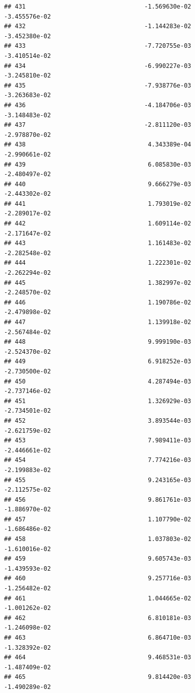 \documentclass[
]{article}
\begin{document}
\begin{verbatim}
## 431                                 -1.569630e-02          -3.455576e-02
## 432                                 -1.144283e-02          -3.452380e-02
## 433                                 -7.720755e-03          -3.410514e-02
## 434                                 -6.990227e-03          -3.245810e-02
## 435                                 -7.938776e-03          -3.263683e-02
## 436                                 -4.184706e-03          -3.148483e-02
## 437                                 -2.811120e-03          -2.978870e-02
## 438                                  4.343389e-04          -2.990661e-02
## 439                                  6.085830e-03          -2.480497e-02
## 440                                  9.666279e-03          -2.443302e-02
## 441                                  1.793019e-02          -2.289017e-02
## 442                                  1.609114e-02          -2.171647e-02
## 443                                  1.161483e-02          -2.282548e-02
## 444                                  1.222301e-02          -2.262294e-02
## 445                                  1.382997e-02          -2.248570e-02
## 446                                  1.190786e-02          -2.479898e-02
## 447                                  1.139918e-02          -2.567484e-02
## 448                                  9.999190e-03          -2.524370e-02
## 449                                  6.918252e-03          -2.730500e-02
## 450                                  4.287494e-03          -2.737146e-02
## 451                                  1.326929e-03          -2.734501e-02
## 452                                  3.893544e-03          -2.621759e-02
## 453                                  7.989411e-03          -2.446661e-02
## 454                                  7.774216e-03          -2.199883e-02
## 455                                  9.243165e-03          -2.112575e-02
## 456                                  9.861761e-03          -1.886970e-02
## 457                                  1.107790e-02          -1.686486e-02
## 458                                  1.037803e-02          -1.610016e-02
## 459                                  9.605743e-03          -1.439593e-02
## 460                                  9.257716e-03          -1.256482e-02
## 461                                  1.044665e-02          -1.001262e-02
## 462                                  6.810181e-03          -1.246098e-02
## 463                                  6.864710e-03          -1.328392e-02
## 464                                  9.468531e-03          -1.487409e-02
## 465                                  9.814420e-03          -1.490289e-02

\end{verbatim}
\end{document}
